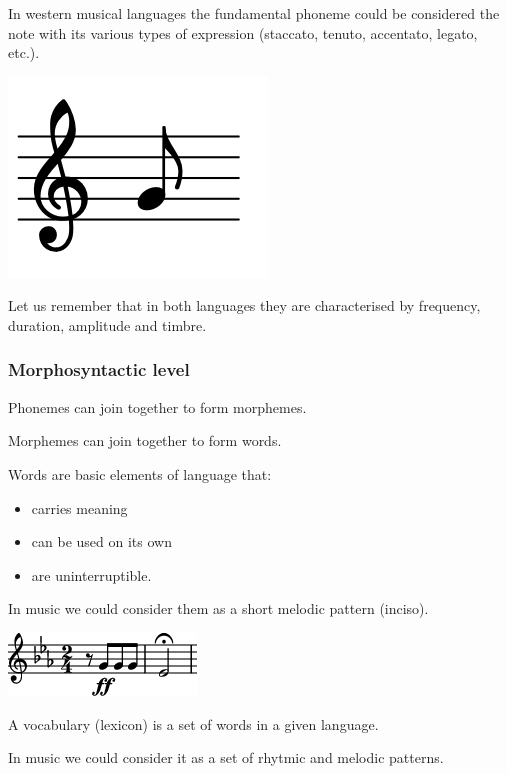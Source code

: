 In western musical languages the fundamental phoneme could be considered the note with its various types of expression (staccato, tenuto, accentato, legato, etc.).

\begin{center}
\includegraphics[scale=0.3]{../img/nota.png}
\end{center}

Let us remember that in both languages they are characterised by frequency, duration, amplitude and timbre.

\subsubsection{Morphosyntactic level }\label{morphosyntactic-level}

Phonemes can join together to form morphemes.

Morphemes can join together to form words.

Words are basic elements of language that: 

\begin{itemize}
\item carries meaning 
\item can be used on its own 
\item are uninterruptible.
\end{itemize}

In music we could consider them as a short melodic pattern (inciso).

\begin{center}
\includegraphics[scale=0.92]{../img/inci.png}
\end{center}

A vocabulary (lexicon) is a set of words in a given language.

In music we could consider it as a set of rhytmic and melodic patterns.

